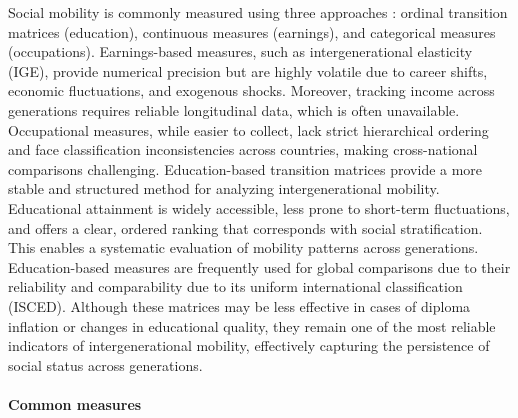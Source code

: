 Social mobility is commonly measured using three approaches \citep{blanden2013cross}: ordinal transition matrices (education), continuous measures (earnings), and categorical measures (occupations). Earnings-based measures, such as intergenerational elasticity (IGE), provide numerical precision but are highly volatile due to career shifts, economic fluctuations, and exogenous shocks. Moreover, tracking income across generations requires reliable longitudinal data, which is often unavailable. Occupational measures, while easier to collect, lack strict hierarchical ordering and face classification inconsistencies across countries, making cross-national comparisons challenging. Education-based transition matrices provide a more stable and structured method for analyzing intergenerational mobility. Educational attainment is widely accessible, less prone to short-term fluctuations, and offers a clear, ordered ranking that corresponds with social stratification. This enables a systematic evaluation of mobility patterns across generations. Education-based measures are frequently used for global comparisons due to their reliability and comparability due to its uniform international classification (ISCED). Although these matrices may be less effective in cases of diploma inflation or changes in educational quality, they remain one of the most reliable indicators of intergenerational mobility, effectively capturing the persistence of social status across generations.

\paragraph{Common measures}  

